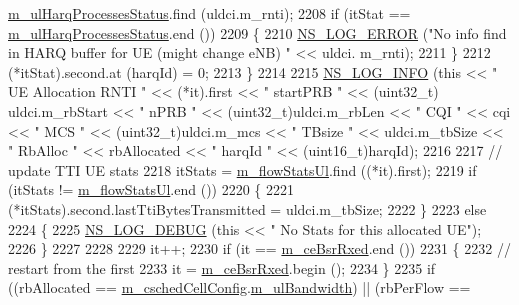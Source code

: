 \begin{DoxyCode}
      \hyperlink{classns3_1_1CqaFfMacScheduler_a6dd8ea014c55132578f7c050e726f856}{m\_ulHarqProcessesStatus}.find (uldci.m\_rnti);
2208           \textcolor{keywordflow}{if} (itStat == \hyperlink{classns3_1_1CqaFfMacScheduler_a6dd8ea014c55132578f7c050e726f856}{m\_ulHarqProcessesStatus}.end ())
2209             \{
2210               \hyperlink{group__logging_ga0261a8db1d4ac5f79417d117634fd455}{NS\_LOG\_ERROR} (\textcolor{stringliteral}{"No info find in HARQ buffer for UE (might change eNB) "} << uldci.
      m\_rnti);
2211             \}
2212           (*itStat).second.at (harqId) = 0;
2213         \}
2214 
2215       \hyperlink{group__logging_gafbd73ee2cf9f26b319f49086d8e860fb}{NS\_LOG\_INFO} (\textcolor{keyword}{this} << \textcolor{stringliteral}{" UE Allocation RNTI "} << (*it).first << \textcolor{stringliteral}{" startPRB "} << (uint32\_t)
      uldci.m\_rbStart << \textcolor{stringliteral}{" nPRB "} << (uint32\_t)uldci.m\_rbLen << \textcolor{stringliteral}{" CQI "} << cqi << \textcolor{stringliteral}{" MCS "} << (uint32\_t)uldci.m\_mcs 
      << \textcolor{stringliteral}{" TBsize "} << uldci.m\_tbSize << \textcolor{stringliteral}{" RbAlloc "} << rbAllocated << \textcolor{stringliteral}{" harqId "} << (uint16\_t)harqId);
2216 
2217       \textcolor{comment}{// update TTI  UE stats}
2218       itStats = \hyperlink{classns3_1_1CqaFfMacScheduler_ab5815a4876dc296d83b3d2d633418312}{m\_flowStatsUl}.find ((*it).first);
2219       \textcolor{keywordflow}{if} (itStats != \hyperlink{classns3_1_1CqaFfMacScheduler_ab5815a4876dc296d83b3d2d633418312}{m\_flowStatsUl}.end ())
2220         \{
2221           (*itStats).second.lastTtiBytesTransmitted =  uldci.m\_tbSize;
2222         \}
2223       \textcolor{keywordflow}{else}
2224         \{
2225           \hyperlink{group__logging_ga413f1886406d49f59a6a0a89b77b4d0a}{NS\_LOG\_DEBUG} (\textcolor{keyword}{this} << \textcolor{stringliteral}{" No Stats for this allocated UE"});
2226         \}
2227 
2228 
2229       it++;
2230       \textcolor{keywordflow}{if} (it == \hyperlink{classns3_1_1CqaFfMacScheduler_ae2ec92c28a8adb7f5d63d658fd1e3949}{m\_ceBsrRxed}.end ())
2231         \{
2232           \textcolor{comment}{// restart from the first}
2233           it = \hyperlink{classns3_1_1CqaFfMacScheduler_ae2ec92c28a8adb7f5d63d658fd1e3949}{m\_ceBsrRxed}.begin ();
2234         \}
2235       \textcolor{keywordflow}{if} ((rbAllocated == \hyperlink{classns3_1_1CqaFfMacScheduler_ad5dc768ca3a3c71671fd64de7de8ec00}{m\_cschedCellConfig}.\hyperlink{structns3_1_1FfMacCschedSapProvider_1_1CschedCellConfigReqParameters_a5ab5b102878e6e7e7727a14af4a64d2f}{m\_ulBandwidth}) || (rbPerFlow ==

\end{DoxyCode}
